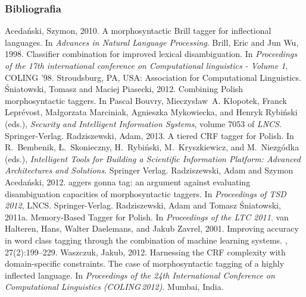 \documentclass{beamer}
\begin{document}
\begin{frame}[allowframebreaks]
  \frametitle{Bibliografia}
  \begin{thebibliography}{10}
  \beamertemplatebookbibitems
Acedański, Szymon, 2010.
\newblock A morphosyntactic {B}rill tagger for inflectional languages.
\newblock In {\em Advances in Natural Language Processing\/}.
  \beamertemplatearticlebibitems
Brill, Eric and Jun Wu, 1998.
\newblock Classifier combination for improved lexical disambiguation.
\newblock In {\em Proceedings of the 17th international conference on
  Computational linguistics - Volume 1\/}, COLING '98. Stroudsburg, PA, USA:
  Association for Computational Linguistics.
  \beamertemplatearticlebibitems
Śniatowski, Tomasz and Maciej Piasecki, 2012.
\newblock Combining {P}olish morphosyntactic taggers.
\newblock In Pascal Bouvry, Mieczysław~A. Kłopotek, Franck Leprévost,
  Małgorzata Marciniak, Agnieszka Mykowiecka, and Henryk Rybiński (eds.),
  {\em Security and Intelligent Information Systems\/}, volume 7053 of {\em
  LNCS\/}. Springer-Verlag.
  \beamertemplatearticlebibitems
Radziszewski, Adam, 2013.
\newblock A tiered {CRF} tagger for {P}olish.
\newblock In R.~Bembenik, {\L}.~Skonieczny, H.~Rybi\'{n}ski, M.~Kryszkiewicz,
  and M.~Niezg{\'o}dka (eds.), {\em Intelligent Tools for Building a Scientific
  Information Platform: Advanced Architectures and Solutions\/}. Springer
  Verlag.
  \beamertemplatearticlebibitems
Radziszewski, Adam and Szymon Acedański, 2012.
aggers gonna tag: an argument against evaluating disambiguation
  capacities of morphosyntactic taggers.
\newblock In {\em Proceedings of TSD 2012\/}, LNCS. Springer-Verlag.
\beamertemplatearticlebibitems
{}
Radziszewski, Adam and Tomasz Śniatowski, 2011a.
 {M}emory-{B}ased {T}agger for {P}olish.
\newblock In {\em Proceedings of the LTC 2011\/}.
\beamertemplatearticlebibitems
{}
van Halteren, Hans, Walter Daelemans, and Jakub Zavrel, 2001.
\newblock Improving accuracy in word class tagging through the combination of
  machine learning systems.
, 27(2):199--229.
\beamertemplatearticlebibitems
{}
Waszczuk, Jakub, 2012.
\newblock Harnessing the {CRF} complexity with domain-specific constraints.
  {T}he case of morphosyntactic tagging of a highly inflected language.
\newblock In {\em Proceedings of the 24th International Conference on
  Computational Linguistics ({COLING}\,2012)\/}. Mumbai, India.
  \end{thebibliography}
\end{frame}
\end{document}
